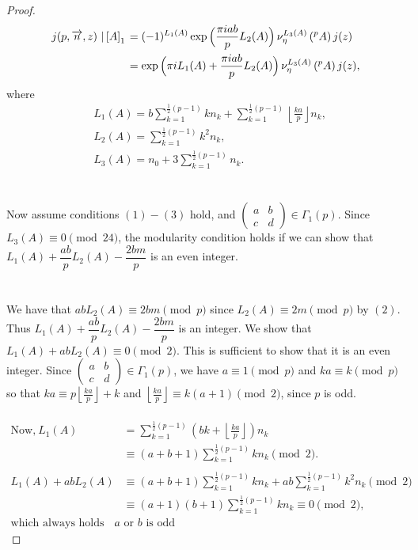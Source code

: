 \documentclass[12pt]{amsart}
\theoremstyle{definition}
\theoremstyle{remark}
\numberwithin{equation}{section}
\newcommand\Lpar[1]{\left(#1\right)}
\newcommand\FL[1]{\left\lfloor#1\right\rfloor}
\newcommand\stroke[3]{#1\,\left\arrowvert\,\left[#2\right]_{#3}\right.}
\begin{document}
\begin{proof}
\begin{align*}
j(p,\overrightarrow{n},z)\stroke{}{A}{1}&=(-1)^{L_1(A)}\exp\Big(\dfrac{\pi i a b}{p}L_2(A)\Big)\,\nu_{\eta}^{L_3(A)}\Lpar{{}^pA}j(z)
\\
&=\exp\Big(\pi i L_1(A)+\dfrac{\pi i a b}{p}L_2(A)\Big)\,\nu_{\eta}^{L_3(A)}\Lpar{{}^pA}j(z),
\end{align*}
where
\begin{align*}
&L_1(A)=b\sum_{k=1}^{\frac{1}{2}(p-1)}kn_k+\sum_{k=1}^{\frac{1}{2}(p-1)}\FL{\frac{ka}{p}} n_k,
\\
&L_2(A)=\sum_{k=1}^{\frac{1}{2}(p-1)}k^2n_k,
\\
&L_3(A)=n_0+3\sum_{k=1}^{\frac{1}{2}(p-1)}n_k.
\end{align*}
\\\\
Now assume conditions $(1)-(3)$ hold, and $\begin{pmatrix} a & b \\ c & d\end{pmatrix} \in \Gamma_1(p)$. Since $L_3(A)\equiv 0 \pmod{24}$, the modularity condition holds if we can show that $L_1(A)+\dfrac{ab}{p}L_2(A)- \dfrac{2bm}{p}$ is an even integer.
\\\\\\
We have that $abL_2(A) \equiv 2bm \pmod{p}$ since $L_2(A) \equiv 2m \pmod{p}$ by $(2)$. Thus $L_1(A)+\dfrac{ab}{p}L_2(A)- \dfrac{2bm}{p}$ is an integer. We show that $L_1(A)+abL_2(A) \equiv 0 \pmod{2}$. This is sufficient to show that it is an even integer. Since $\begin{pmatrix} a & b \\ c & d\end{pmatrix} \in \Gamma_1(p)$, we have $a \equiv 1 \pmod{p}$ and $ka\equiv k \pmod{p}$ so that $ka\equiv p \FL{\frac{ka}{p}}+k$ and $\FL{\frac{ka}{p}} \equiv k(a+1) \pmod{2}$, since $p$ is odd.
\\\\
\begin{align*}
\text{Now,}~ L_1(A) &= \sum_{k=1}^{\frac{1}{2}(p-1)}(bk+\FL{\frac{ka}{p}}) n_k 
\\
&\equiv (a+b+1)\sum_{k=1}^{\frac{1}{2}(p-1)}k n_k \pmod{2}.
\\\\
L_1(A)+abL_2(A) &\equiv (a+b+1)\sum_{k=1}^{\frac{1}{2}(p-1)}kn_k+ab\sum_{k=1}^{\frac{1}{2}(p-1)}k^2 n_k \pmod{2}\\
&\equiv (a+1)(b+1)\sum_{k=1}^{\frac{1}{2}(p-1)}kn_k\equiv 0 \pmod{2}, \\ \text{which always holds since either $a$ or $b$ is odd}.
\end{align*} 

\end{proof}
\end{document}
